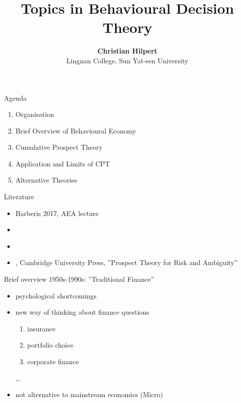 \documentclass[11pt, aspectratio=169]{beamer}
\begin{document}
\title{Topics in Behavioural Decision  Theory}

\author[Christian Hilpert]
{
{\bf Christian Hilpert}\\
{\small Lingnan College, Sun Yat-sen University}\\[1ex]
}


\begin{frame}
    \titlepage
    \note{~}
\end{frame}

\begin{frame}{Agenda}
    \begin{enumerate}
        \item Organisation\bigskip
        \item Brief Overview of Behavioural Economy\bigskip
        \item Cumulative Prospect Theory\bigskip
        \item Application and Limits of CPT\bigskip
        \item Alternative Theories\bigskip
    \end{enumerate}
\end{frame}

\begin{frame}{Literature}
    \begin{itemize}
        \item Barberis 2017, AEA  lecture\bigskip
        \item \citet{Thaler2016}\bigskip
        \item \citet{Barberis2013a}\bigskip
        \item \citet{Wakker2010}, Cambridge University Press, ''Prospect Theory for Risk and Ambiguity''\bigskip
	\end{itemize}
\end{frame}

\begin{frame}{Brief overview}
    1950s-1990s: ''Traditional Finance''\bigskip
\begin{itemize}
	\item psychological shortcomings \bigskip
    \item new way of thinking about finance questions\bigskip
        \begin{enumerate}
            \item insurance\medskip
            \item portfolio choice\medskip
            \item corporate finance\medskip
        \end{enumerate}
        \ldots
    \item not alternative to mainstream economics (Micro)\bigskip
\end{itemize}
\end{frame}
\end{document}
